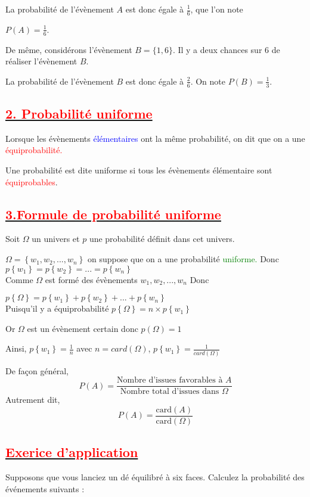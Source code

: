 \documentclass[12pt]{article}
\begin{document}
La probabilité de l'évènement $A$ est donc égale à $\frac{1}{6}$, que l'on note

 $P(A)=\frac{1}{6}$.

De même, considérons l'évènement $B=\{1, 6\}$. Il y a deux chances sur 6 de réaliser l'évènement $B$.

La probabilité de l'évènement $B$ est donc égale à $\frac{2}{6}$. On note $P(B)=\frac{1}{3}$.
\subsection*{\underline{\textbf{\textcolor{red}{2. Probabilité uniforme}}}}
Lorsque les évènements \textcolor{blue}{élémentaires} ont la même probabilité, on dit que on a une 
\textcolor{red}{équiprobabilité.}

Une probabilité est dite uniforme si tous les évènements élémentaire sont \textcolor{red}{équiprobables}.\\
\subsection*{\underline{\textbf{\textcolor{red}{3.Formule de probabilité uniforme}}}}
Soit $\Omega$ un univers et $p$ une probabilité définit dans cet univers.

$\Omega=\left\lbrace w_{1}, w_{2},...,w_{n}\right\rbrace $ on suppose que on a une probabilité \textcolor{green}{uniforme.}
Donc $p\left\lbrace w_{1} \right\rbrace =p\left\lbrace w_{2} \right\rbrace =...
=p\left\lbrace w_{n} \right\rbrace$\\
Comme $\Omega$ est formé des évènements $w_{1}, w_{2},...,w_{n}$ Donc


$p\left\lbrace \Omega\right\rbrace =p\left\lbrace w_{1} \right\rbrace +p\left\lbrace w_{2} \right\rbrace +...+p\left\lbrace w_{n} \right\rbrace$\\
Puisqu'il y a équiprobabilité 
$p\left\lbrace \Omega\right\rbrace =n\times p\left\lbrace w_{1} \right\rbrace$

Or $\Omega$ est un évènement certain donc $p(\Omega)=1$

Ainsi, $p\left\lbrace w_{1} \right\rbrace=\frac{1}{n}$ avec $n=card(\Omega)$, 
$p\left\lbrace w_{1} \right\rbrace=\frac{1}{card(\Omega)}$

De façon général, \[ P(A) = \frac{\text{Nombre d'issues favorables à } A}{\text{Nombre total d'issues dans } \Omega} \]
Autrement dit, \[ P(A) = \frac{\text{card} (A)}{\text{card} (\Omega)} \]
\subsection*{\underline{\textbf{\textcolor{red}{Exerice d'application}}}}
Supposons que vous lanciez un dé équilibré à six faces. Calculez la probabilité des événements suivants :
\end{document}
